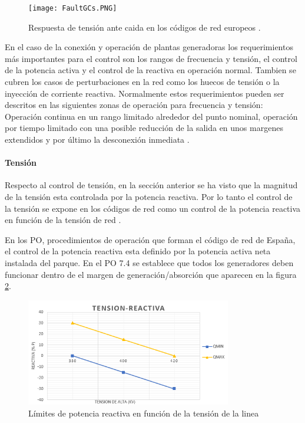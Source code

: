 \documentclass{book}
\begin{document}
\begin{figure}[h!]
\centering
\texttt{[image: FaultGCs.PNG]}
\caption{Respuesta de tensi\'on ante caida en los c\'odigos de red europeos \cite{FaultGC}.}
\label{FaultGCs}
\end{figure}

En el caso de la conexi\'on y operaci\'on de plantas generadoras los requerimientos m\'as importantes para el control son los rangos de frecuencia y tensi\'on, el control de la potencia activa y el control de la reactiva en operaci\'on normal. Tambien se cubren los casos de perturbaciones en la red como los huecos de tensi\'on o la inyecci\'on de corriente reactiva. Normalmente estos requerimientos pueden ser descritos en las siguientes zonas de operaci\'on para frecuencia y tensi\'on: Operaci\'on continua en un rango limitado alrededor del punto nominal, operaci\'on por tiempo limitado con una posible reducci\'on de la salida en unos margenes extendidos y por \'ultimo la desconexi\'on inmediata \cite{GridCodeDeepAnalisys}.\par

		\paragraph{Tensi\'on}
Respecto al control de tensi\'on, en la secci\'on anterior se ha visto que la magnitud de la tensi\'on esta controlada por la potencia reactiva. Por lo tanto el control de la tensi\'on se expone en los c\'odigos de red como un control de la potencia reactiva en funci\'on de la tensi\'on de red \cite{WFgridcode}. \par

En los PO, procedimientos de operaci\'on que forman el c\'odigo de red de España, el control de la potencia reactiva esta definido por la potencia activa neta instalada del parque. En el PO 7.4 \cite{PO74}  se establece que todos los generadores deben funcionar dentro de el margen de generaci\'on/absorci\'on que aparecen en la figura \ref{VQgridcode}.   \par 

\begin{figure}[h!]
\centering
\includegraphics[width=0.8\textwidth]{VQgridcode.PNG}
\caption{L\'imites de potencia reactiva en funci\'on de la tensi\'on de la linea}
\label{VQgridcode}
\end{figure}
\end{document}
